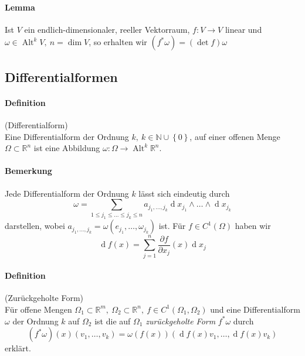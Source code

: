 \documentclass[12pt,a4paper,fleqn]{article}
\def\set#1{{\left\{ #1 \right\}}}
\def\R{{\mathbb{R}}}
\def\d{{\operatorname{d}}}
\begin{document}
\paragraph{Lemma} Ist $V$ ein endlich-dimensionaler, reeller Vektorraum, $f\colon V \rightarrow V$ linear und $\omega \in \operatorname{Alt}^k V,\ n = \dim V$, so erhalten wir $(f^\ast\omega) = (\det f)\omega$

\subsection{Differentialformen}

\paragraph{Definition} (Differentialform)\\
Eine Differentialform der Ordnung $k,\ k \in\mathbb{N} \cup \set{0}$, auf einer offenen Menge $\Omega \subset \R^n$ ist eine Abbildung $\omega\colon \Omega \rightarrow \operatorname{Alt}^k \R^n$.

\paragraph{Bemerkung} Jede Differentialform der Ordnung $k$ lässt sich eindeutig durch 
\begin{displaymath}
\omega = \sum_{1 \leq j_1 \leq \dots \leq j_k \leq n} a_{j_1, \dots, j_k} \d x_{j_1}\wedge\dots\wedge\d x_{j_k}
\end{displaymath}
darstellen, wobei $a_{j_1, \dots, j_k} = \omega(e_{j_1}, \dots, \omega_{j_k})$ ist. Für $f \in C^1(\Omega)$ haben wir 
\begin{displaymath}
\d f(x) = \sum_{j=1}^n \frac{\partial f}{\partial x_j}(x) \d x_j
\end{displaymath}

\paragraph{Definition} (Zurückgeholte Form)\\
Für offene Mengen $\Omega_1 \subset \R^m,\ \Omega_2 \subset \R^n,\ f \in C^1(\Omega_1, \Omega_2)$ und eine Differentialform $\omega$ der Ordnung $k$ auf $\Omega_2$ ist die auf $\Omega_1$ \textit{zurückgeholte Form} $f^\ast\omega$ durch 
\begin{displaymath}
(f^\ast\omega)(x)(v_1, \dots, v_k)=\omega(f(x))(\d f(x)v_1, \dots, \d f(x)v_k)
\end{displaymath}
erklärt.
\end{document}
